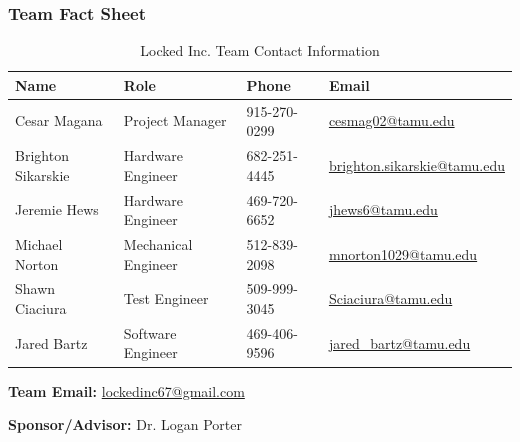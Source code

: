 \subsubsection{Team Fact Sheet}

\begin{table}[H]
\centering
\caption{Locked Inc. Team Contact Information}
\label{tab:team_fact_sheet}
\begin{tabular}{@{}llll@{}}
\toprule
\textbf{Name} & \textbf{Role} & \textbf{Phone} & \textbf{Email} \\
\midrule
Cesar Magana & Project Manager & 915-270-0299 & \href{mailto:cesmag02@tamu.edu}{cesmag02@tamu.edu} \\
Brighton Sikarskie & Hardware Engineer & 682-251-4445 & \href{mailto:brighton.sikarskie@tamu.edu}{brighton.sikarskie@tamu.edu} \\
Jeremie Hews & Hardware Engineer & 469-720-6652 & \href{mailto:jhews6@tamu.edu}{jhews6@tamu.edu} \\
Michael Norton & Mechanical Engineer & 512-839-2098 & \href{mailto:mnorton1029@tamu.edu}{mnorton1029@tamu.edu} \\
Shawn Ciaciura & Test Engineer & 509-999-3045 & \href{mailto:Sciaciura@tamu.edu}{Sciaciura@tamu.edu} \\
Jared Bartz & Software Engineer & 469-406-9596 & \href{mailto:jared_bartz@tamu.edu}{jared\_bartz@tamu.edu} \\
\bottomrule
\end{tabular}
\end{table}

\noindent\textbf{Team Email:} \href{mailto:lockedinc67@gmail.com}{lockedinc67@gmail.com}

\noindent\textbf{Sponsor/Advisor:} Dr. Logan Porter
